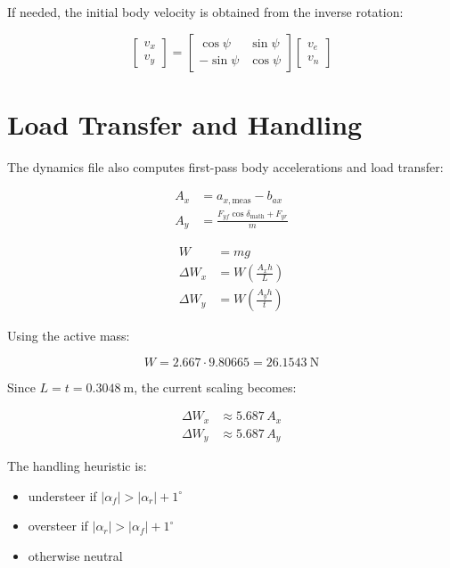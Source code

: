 \documentclass[11pt]{article}
\begin{document}
If needed, the initial body velocity is obtained from the inverse rotation:

\begin{equation}
\begin{bmatrix}
v_x \\ v_y
\end{bmatrix}
=
\begin{bmatrix}
\cos\psi & \sin\psi \\
-\sin\psi & \cos\psi
\end{bmatrix}
\begin{bmatrix}
v_e \\ v_n
\end{bmatrix}
\end{equation}

\section{Load Transfer and Handling}

The dynamics file also computes first-pass body accelerations and load transfer:

\begin{align}
A_x &= a_{x,\text{meas}} - b_{ax} \\
A_y &= \frac{F_{yf}\cos\delta_{\text{math}} + F_{yr}}{m}
\end{align}

\begin{align}
W &= mg \\
\Delta W_x &= W\left(\frac{A_x h}{L}\right) \\
\Delta W_y &= W\left(\frac{A_y h}{t}\right)
\end{align}

Using the active mass:

\begin{equation}
W = 2.667 \cdot 9.80665 = 26.1543~\text{N}
\end{equation}

Since $L = t = 0.3048~\text{m}$, the current scaling becomes:

\begin{align}
\Delta W_x &\approx 5.687\,A_x \\
\Delta W_y &\approx 5.687\,A_y
\end{align}

The handling heuristic is:

\begin{itemize}
    \item understeer if $|\alpha_f| > |\alpha_r| + 1^\circ$
    \item oversteer if $|\alpha_r| > |\alpha_f| + 1^\circ$
    \item otherwise neutral
\end{itemize}
\end{document}
